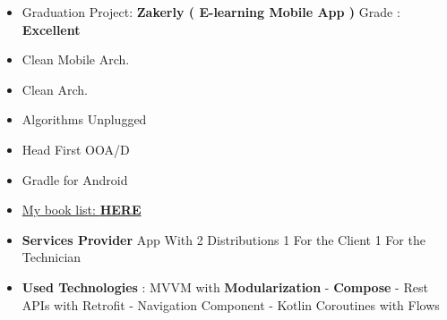 \documentclass[10pt,a4paper,ragged2e,withhyper]{altacv}
\begin{document}
\begin{paracol}{2}
        \begin{itemize}
            \item Graduation Project: \textbf{Zakerly ( E-learning Mobile App )} Grade : \textbf{Excellent}
        \end{itemize}


        \begin{multicols}{3}

        {\small\begin{itemize}
                   \item[\textcolor{PrimaryColor}{\faBook}] Clean Mobile Arch.
                   \item[\textcolor{PrimaryColor}{\faBook}] Clean Arch.
                   \item[\textcolor{PrimaryColor}{\faBook}] Algorithms Unplugged
                   \item[\textcolor{PrimaryColor}{\faBook}] Head First OOA/D
                   \item[\textcolor{PrimaryColor}{\faBook}] Gradle for Android
                   \item[\textcolor{PrimaryColor}{\faTrello}] \href{https://trello.com/b/pkZlgQVu/my-readings-board}{My book list: \textbf{\textcolor{TertiaryColor}{HERE}}}
        \end{itemize}}

        \end{multicols}

    \end{paracol}

    \vspace{2px}

    \vspace{2px}


    \hypertarget{samoolah}{}



    \begin{itemize}
        \item \textbf{Services Provider} App With 2 Distributions 1 For the Client 1 For the Technician
        \item \textbf{Used Technologies} : MVVM with \textbf{Modularization} - \textbf{Compose} - Rest APIs with Retrofit - Navigation Component - Kotlin Coroutines with Flows
    \end{itemize}
    \divider
\end{document}
